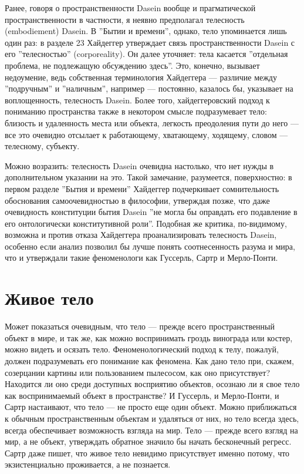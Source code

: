 \documentclass[11pt]{book}
\begin{document}
Ранее, говоря о пространственности Dasein вообще и прагматической пространственности в частности, я неявно предполагал телесность (embodiement) Dasein. В ''Бытии и времени'', однако, тело упоминается лишь один раз: в разделе 23 Хайдеггер утверждает связь пространственности Dasein с его ''телесностью'' (corporeality). Он далее уточняет: тела касается ''отдельная проблема, не подлежащую обсуждению здесь''. Это, конечно, вызывает недоумение, ведь собственная терминология Хайдеггера --- различие между ''подручным'' и ''наличным'', например --- постоянно, казалось бы, указывает на воплощенность, телесность Dasein. Более того, хайдеггеровский подход к пониманию пространства также в некотором смысле подразумевает тело: близость и удаленность места или объекта, легкость преодоления пути до него --- все это очевидно отсылает к работающему, хватающему, ходящему, словом --- телесному, субъекту.

Можно возразить: телесность Dasein очевидна настолько, что нет нужды в дополнительном указании на это. Такой замечание, разумеется, поверхностно: в первом разделе ''Бытия и времени'' Хайдеггер подчеркивает сомнительность обоснования самоочевидностью в философии, утверждая позже, что даже очевидность конституции бытия Dasein ''не могла бы оправдать его подавление в его онтологически конститутивной роли''. Подобная же критика, по-видимому, возможна и против отказа Хайдеггера проанализировать телесность Dasein, особенно если анализ позволил бы лучше понять соотнесенность разума и мира, что и утверждали такие феноменологи как Гуссерль, Сартр и Мерло-Понти.

\section{Живое тело}

Может показаться очевидным, что тело --- прежде всего пространственный объект в мире, и так же, как можно воспринимать гроздь винограда или костер, можно видеть и осязать тело. Феноменологический подход к телу, пожалуй, должен подразумевать его понимание как феномена. Как дано тело при, скажем, созерцании картины или пользованием пылесосом, как оно присутствует? Находится ли оно среди доступных восприятию объектов, осознаю ли я свое тело как воспринимаемый объект в пространстве? И Гуссерль, и Мерло-Понти, и Сартр настаивают, что тело --- не просто еще один объект. Можно приближаться к обычным пространственным объектам и удаляться от них, но тело всегда здесь, всегда обеспечивает возможность взгляда на мир. Тело --- прежде всего взгляд на мир, а не объект, утверждать обратное значило бы начать бесконечный регресс. Сартр даже пишет, что живое тело невидимо присутствует именно потому, что экзистенциально проживается, а не познается.
\end{document}
